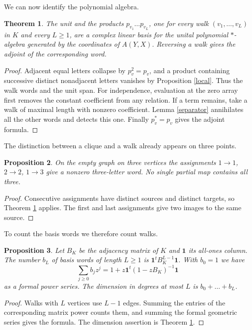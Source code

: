 \documentclass[11pt,a4paper]{article}
\newtheorem{thm}{Theorem}[section]
\newtheorem{prop}[thm]{Proposition}
\begin{document}
We can now identify the polynomial algebra.

\begin{thm}\label{words}
The unit and the products $p_{v_1}\ldots p_{v_L}$, one for every walk $(v_1,\ldots,v_L)$ in $K$ and every $L\geq1$, are a complex linear basis for the unital polynomial $*$-algebra generated by the coordinates of $A(Y,X)$. Reversing a walk gives the adjoint of the corresponding word.
\end{thm}
\begin{proof}
Adjacent equal letters collapse by $p_v^2=p_v$, and a product containing successive distinct nonadjacent letters vanishes by Proposition \ref{local}. Thus the walk words and the unit span. For independence, evaluation at the zero array first removes the constant coefficient from any relation. If a term remains, take a walk of maximal length with nonzero coefficient. Lemma \ref{separator} annihilates all the other words and detects this one. Finally $p_v^*=p_v$ gives the adjoint formula.
\end{proof}

The distinction between a clique and a walk already appears on three points.

\begin{prop}
On the empty graph on three vertices the assignments $1\to1$, $2\to2$, $1\to3$ give a nonzero three-letter word. No single partial map contains all three.
\end{prop}
\begin{proof}
Consecutive assignments have distinct sources and distinct targets, so Theorem \ref{words} applies. The first and last assignments give two images to the same source.
\end{proof}

To count the basis words we therefore count walks.

\begin{prop}\label{growth}
Let $B_K$ be the adjacency matrix of $K$ and $\mathbf{1}$ its all-ones column. The number $b_L$ of basis words of length $L\geq1$ is $\mathbf{1}^tB_K^{L-1}\mathbf{1}$. With $b_0=1$ we have
\[
 \sum_{j\geq0}b_j z^j=1+z\mathbf{1}^t(1-zB_K)^{-1}\mathbf{1}
\]
as a formal power series. The dimension in degrees at most $L$ is $b_0+\ldots+b_L$.
\end{prop}
\begin{proof}
Walks with $L$ vertices use $L-1$ edges. Summing the entries of the corresponding matrix power counts them, and summing the formal geometric series gives the formula. The dimension assertion is Theorem \ref{words}.
\end{proof}
\end{document}
